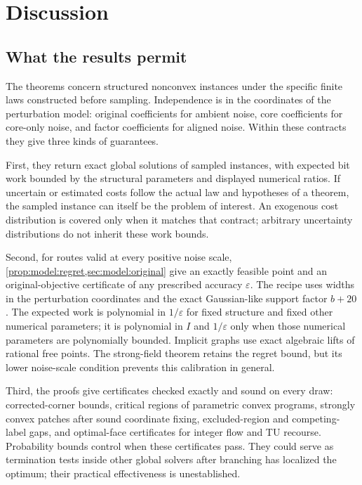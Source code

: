 \section{Discussion}\label{sec:disc}

\subsection{What the results permit}\label{sec:disc:uses}

The theorems concern structured nonconvex instances under the specific finite
laws constructed before sampling. Independence is in the coordinates of the
perturbation model: original coefficients for ambient noise, core
coefficients for core-only noise, and factor coefficients for aligned noise.
Within these contracts they give three kinds of guarantees.

First, they return exact global solutions of sampled instances, with expected
bit work bounded by the structural parameters and displayed numerical
ratios. If uncertain or estimated costs follow the actual law and hypotheses
of a theorem, the sampled instance can itself be the problem of interest.
An exogenous cost distribution is covered only when it matches that
contract; arbitrary uncertainty distributions do not inherit these work
bounds.

Second, for routes valid at every positive noise scale,
\cref{prop:model:regret,sec:model:original} give an exactly feasible point and
an original-objective certificate of any prescribed accuracy $\varepsilon$.
The recipe uses widths in the perturbation coordinates and the exact
Gaussian-like support factor $b+20$. The expected work is polynomial in
$1/\varepsilon$ for fixed structure and fixed other numerical parameters;
it is polynomial in $I$ and $1/\varepsilon$ only when those numerical
parameters are polynomially bounded. Implicit graphs use exact algebraic
lifts of rational free points. The strong-field theorem retains the regret
bound, but its lower noise-scale condition prevents this calibration in
general.

Third, the proofs give certificates checked exactly and sound on every draw:
corrected-corner bounds, critical regions of parametric convex programs,
strongly convex patches after sound coordinate fixing, excluded-region and
competing-label gaps, and optimal-face certificates for integer flow and TU
recourse. Probability bounds control when these certificates pass. They
could serve as termination tests inside other global solvers after branching
has localized the optimum; their practical effectiveness is unestablished.

